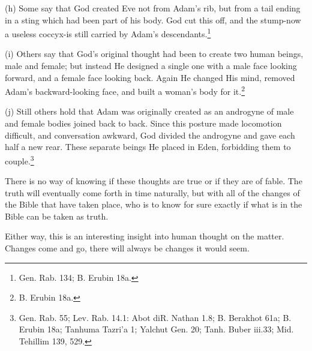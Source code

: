 \documentclass{article}
\begin{document}
(h) Some say that God created Eve not from Adam's rib, but from a
tail ending in a sting which had been part of his body. God cut
this off, and the stump-now a useless coccyx-is still carried by
Adam's descendants.\footnote{Gen. Rab. 134; B. Erubin 18a.}

(i) Others say that God's original thought had been to create two
human beings, male and female; but instead He designed a single
one with a male face looking forward, and a female face looking
back. Again He changed His mind, removed Adam's backward-looking
face, and built a woman's body for it.\footnote{B. Erubin 18a.}

 (j) Still others hold that Adam was originally created as an
androgyne of male and female bodies joined back to back. Since
this posture made locomotion difficult, and conversation awkward,
God divided the androgyne and gave each half a new rear. These
separate beings He placed in Eden, forbidding them to 
couple.\footnote{Gen. Rab. 55; Lev. Rab. 14.1: Abot diR. Nathan 1.8; B.
Berakhot 61a; B. Erubin 18a; Tanhuma Tazri'a 1; Yalchut Gen. 20;
Tanh. Buber iii.33; Mid. Tehillim 139, 529.}

There is no way of knowing if these thoughts are true or if they are of fable.
The truth will eventually come forth in time naturally, but with all of the
changes of the Bible that have taken place, who is to know for sure exactly if
what is in the Bible can be taken as truth.

Either way, this is an interesting insight into human thought on the matter.
Changes come and go, there will always be changes it would seem.

\newpage

\printbibliography
\thispagestyle{empty}
\end{document}

